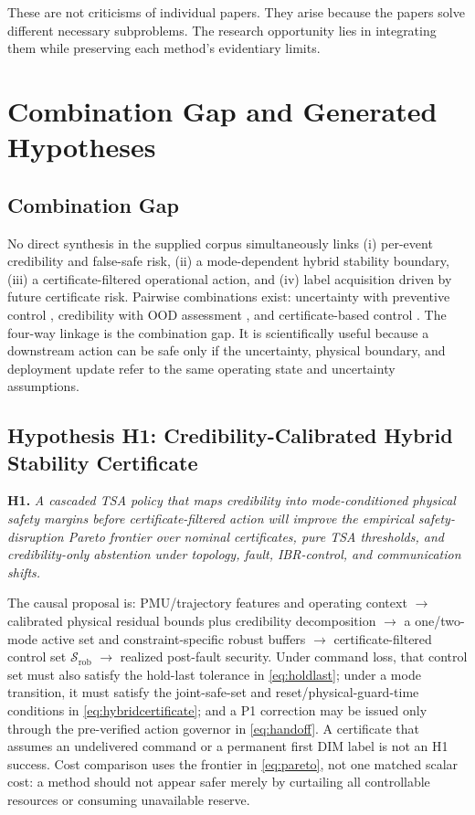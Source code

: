 \documentclass[conference]{IEEEtran}
\newcommand{\safe}{\mathcal{S}}
\begin{document}
These are not criticisms of individual papers. They arise because the papers solve different necessary subproblems. The research opportunity lies in integrating them while preserving each method's evidentiary limits.

\section{Combination Gap and Generated Hypotheses}

\subsection{Combination Gap}

No direct synthesis in the supplied corpus simultaneously links (i) per-event credibility and false-safe risk, (ii) a mode-dependent hybrid stability boundary, (iii) a certificate-filtered operational action, and (iv) label acquisition driven by future certificate risk. Pairwise combinations exist: uncertainty with preventive control \cite{su2024}, credibility with OOD assessment \cite{li2025}, and certificate-based control \cite{zhao2023}. The four-way linkage is the combination gap. It is scientifically useful because a downstream action can be safe only if the uncertainty, physical boundary, and deployment update refer to the same operating state and uncertainty assumptions.

\subsection{Hypothesis H1: Credibility-Calibrated Hybrid Stability Certificate}

\textbf{H1.} \emph{A cascaded TSA policy that maps credibility into mode-conditioned physical safety margins before certificate-filtered action will improve the empirical safety-disruption Pareto frontier over nominal certificates, pure TSA thresholds, and credibility-only abstention under topology, fault, IBR-control, and communication shifts.}

The causal proposal is: PMU/trajectory features and operating context $\rightarrow$ calibrated physical residual bounds plus credibility decomposition $\rightarrow$ a one/two-mode active set and constraint-specific robust buffers $\rightarrow$ certificate-filtered control set $\safe_{\mathrm{rob}}$ $\rightarrow$ realized post-fault security. Under command loss, that control set must also satisfy the hold-last tolerance in \eqref{eq:holdlast}; under a mode transition, it must satisfy the joint-safe-set and reset/physical-guard-time conditions in \eqref{eq:hybridcertificate}; and a P1 correction may be issued only through the pre-verified action governor in \eqref{eq:handoff}. A certificate that assumes an undelivered command or a permanent first DIM label is not an H1 success. Cost comparison uses the frontier in \eqref{eq:pareto}, not one matched scalar cost: a method should not appear safer merely by curtailing all controllable resources or consuming unavailable reserve.
\end{document}
